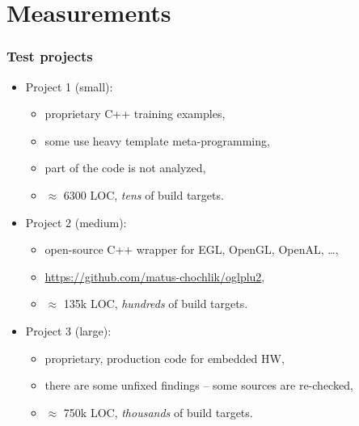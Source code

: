 \documentclass[compress,table,xcolor=table]{beamer}
\begin{document}
\section{Measurements}
\begin{frame}
  \Huge
\end{frame}
\begin{frame}
  \frametitle{Test projects}
    \Large
    \begin{itemize}
    \item Project 1 (small):
    \begin{itemize}
    \large
    \item proprietary C++ training examples,
    \item some use {\LARGE heavy} template meta-programming,
    \item part of the code is not analyzed,
    \item {\larger $\approx$ 6300 LOC}, {\em \larger tens} of build targets.
    \end{itemize}
    \item Project 2 (medium):
    \begin{itemize}
    \large
    \item open-source C++ wrapper for EGL, OpenGL, OpenAL, \ldots,
    \item \url{https://github.com/matus-chochlik/oglplu2},
    \item {\larger $\approx$ 135k LOC}, {\em \larger hundreds} of build targets.
    \end{itemize}
    \item Project 3 (large):
    \begin{itemize}
    \large
    \item proprietary, production code for embedded HW,
    \item there are some unfixed findings -- some sources are re-checked,
    \item {\larger $\approx$ 750k LOC}, {\em \larger thousands} of build targets.
    \end{itemize}
    \end{itemize}
\end{frame}
\end{document}
